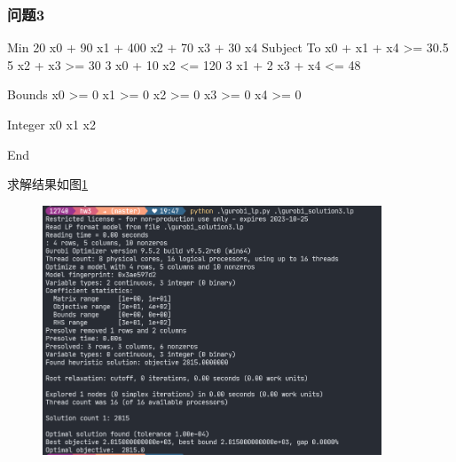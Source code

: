 \subsubsection{问题3}

\begin{python}
    Min
    20 x0 + 90 x1 + 400 x2 + 70 x3 + 30 x4
    Subject To
        x0 + x1 + x4 >= 30.5
        5 x2 + x3 >= 30
        3 x0 + 10 x2 <= 120
        3 x1 + 2 x3 + x4 <= 48

    Bounds
    x0 >= 0
    x1 >= 0
    x2 >= 0
    x3 >= 0
    x4 >= 0

    Integer
    x0 x1 x2

    End
\end{python}

求解结果如图\ref{fig:ans3}

\begin{figure}[H]
    \begin{center}
        \includegraphics[width=0.9\textwidth]{ans3.png}
    \end{center}
    \caption{}
    \label{fig:ans3}
\end{figure}

